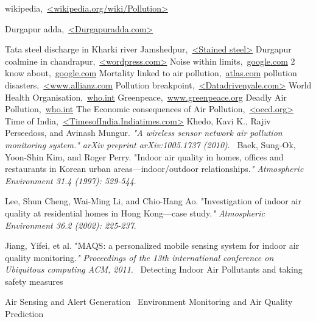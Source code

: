 \cleardoublepage
{}
{}
\begin{thebibliography}{99}

wikipedia,\ \url{<wikipedia.org/wiki/Pollution>}

Durgapur adda,\ \url{<Durgapuradda.com>}

Tata steel discharge in Kharki river Jamshedpur,\ \url{<Stained steel>}
Durgapur coalmine in chandrapur,\ \url{<wordpress.com>}
Noise within limits,\ \url{google.com}
2 know about,\ \url{google.com}
Mortality linked to air pollution,\ \url{atlas.com}
pollution disasters,\ \url{<www.allianz.com}
Pollution breakpoint,\ \url{<Datadrivenyale.com>}
World Health Organisation,\ \url{who.int}
Greenpeace,\ \url{www.greenpeace.org}
Deadly Air Pollution,\ \url{who.int}
The Economic consequences of Air Pollution,\ \url{<oecd.org>}
Time of India,\ \url{<TimesofIndia.Indiatimes.com>}
Khedo, Kavi K., Rajiv Perseedoss, and Avinash Mungur. \textit{"A wireless sensor network air pollution monitoring system." arXiv preprint arXiv:1005.1737 (2010)}.\ \url{}
Baek, Sung-Ok, Yoon-Shin Kim, and Roger Perry. "Indoor air quality in homes, offices and restaurants in Korean urban areas—indoor/outdoor relationships.\textit{" Atmospheric Environment 31.4 (1997): 529-544}.
\ \url{}

Lee, Shun Cheng, Wai-Ming Li, and Chio-Hang Ao. "Investigation of indoor air quality at residential homes in Hong Kong—case study.\textit{" Atmospheric Environment 36.2 (2002): 225-237}. 

Jiang, Yifei, et al. "MAQS: a personalized mobile sensing system for indoor air quality monitoring.\textit{" Proceedings of the 13th international conference on Ubiquitous computing ACM, 2011}.\ \url{}
Detecting Indoor Air Pollutants and taking safety measures\ \url{}

Air Sensing and Alert Generation\ \url{}
Environment Monitoring and Air Quality Prediction\ \url{}


\end{thebibliography}
